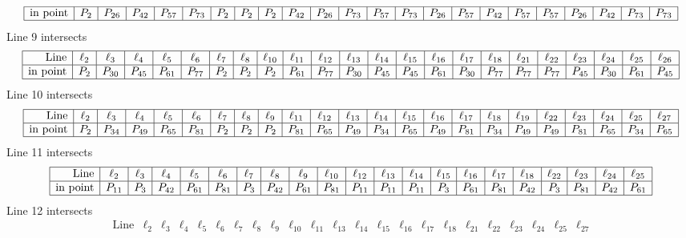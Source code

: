 \documentclass{article}
\begin{document}
{$$\begin{array}{|r*{22}{|c}|}
\hline
\mbox{in point}  & P_{2} & P_{26} & P_{42} & P_{57} & P_{73} & P_{2} & P_{2} & P_{2} & P_{42} & P_{26} & P_{73} & P_{57} & P_{73} & P_{26} & P_{57} & P_{42} & P_{57} & P_{57} & P_{26} & P_{42} & P_{73} & P_{73}\\
\hline
\end{array}
$$
Line 9 intersects 
$$
\begin{array}{|r*{22}{|c}|}
\hline
\mbox{Line}  & \ell_{2} & \ell_{3} & \ell_{4} & \ell_{5} & \ell_{6} & \ell_{7} & \ell_{8} & \ell_{10} & \ell_{11} & \ell_{12} & \ell_{13} & \ell_{14} & \ell_{15} & \ell_{16} & \ell_{17} & \ell_{18} & \ell_{21} & \ell_{22} & \ell_{23} & \ell_{24} & \ell_{25} & \ell_{26}\\
\hline
\mbox{in point}  & P_{2} & P_{30} & P_{45} & P_{61} & P_{77} & P_{2} & P_{2} & P_{2} & P_{61} & P_{77} & P_{30} & P_{45} & P_{45} & P_{61} & P_{30} & P_{77} & P_{77} & P_{77} & P_{45} & P_{30} & P_{61} & P_{45}\\
\hline
\end{array}
$$
Line 10 intersects 
$$
\begin{array}{|r*{22}{|c}|}
\hline
\mbox{Line}  & \ell_{2} & \ell_{3} & \ell_{4} & \ell_{5} & \ell_{6} & \ell_{7} & \ell_{8} & \ell_{9} & \ell_{11} & \ell_{12} & \ell_{13} & \ell_{14} & \ell_{15} & \ell_{16} & \ell_{17} & \ell_{18} & \ell_{19} & \ell_{22} & \ell_{23} & \ell_{24} & \ell_{25} & \ell_{27}\\
\hline
\mbox{in point}  & P_{2} & P_{34} & P_{49} & P_{65} & P_{81} & P_{2} & P_{2} & P_{2} & P_{81} & P_{65} & P_{49} & P_{34} & P_{65} & P_{49} & P_{81} & P_{34} & P_{49} & P_{49} & P_{81} & P_{65} & P_{34} & P_{65}\\
\hline
\end{array}
$$
Line 11 intersects 
$$
\begin{array}{|r*{20}{|c}|}
\hline
\mbox{Line}  & \ell_{2} & \ell_{3} & \ell_{4} & \ell_{5} & \ell_{6} & \ell_{7} & \ell_{8} & \ell_{9} & \ell_{10} & \ell_{12} & \ell_{13} & \ell_{14} & \ell_{15} & \ell_{16} & \ell_{17} & \ell_{18} & \ell_{22} & \ell_{23} & \ell_{24} & \ell_{25}\\
\hline
\mbox{in point}  & P_{11} & P_{3} & P_{42} & P_{61} & P_{81} & P_{3} & P_{42} & P_{61} & P_{81} & P_{11} & P_{11} & P_{11} & P_{3} & P_{61} & P_{81} & P_{42} & P_{3} & P_{81} & P_{42} & P_{61}\\
\hline
\end{array}
$$
Line 12 intersects 
$$
\begin{array}{|r*{22}{|c}|}
\hline
\mbox{Line}  & \ell_{2} & \ell_{3} & \ell_{4} & \ell_{5} & \ell_{6} & \ell_{7} & \ell_{8} & \ell_{9} & \ell_{10} & \ell_{11} & \ell_{13} & \ell_{14} & \ell_{15} & \ell_{16} & \ell_{17} & \ell_{18} & \ell_{21} & \ell_{22} & \ell_{23} & \ell_{24} & \ell_{25} & \ell_{27}\\

\end{array}$$}
\end{document}
